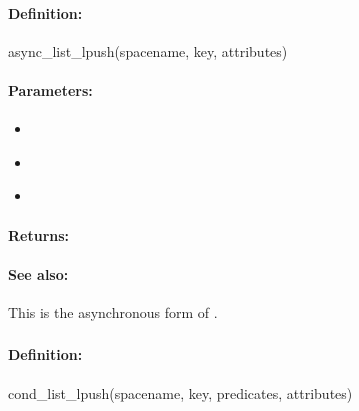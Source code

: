 \paragraph{Definition:}
\begin{rubycode}
async_list_lpush(spacename, key, attributes)
\end{rubycode}

\paragraph{Parameters:}
\begin{itemize}[noitemsep]
\item {}\\

\item {}\\

\item {}\\

\end{itemize}

\paragraph{Returns:}


\paragraph{See also:}  This is the asynchronous form of .

\pagebreak
\subsubsection{}
\label{api:ruby:cond_list_lpush}


\paragraph{Definition:}
\begin{rubycode}
cond_list_lpush(spacename, key, predicates, attributes)
\end{rubycode}

